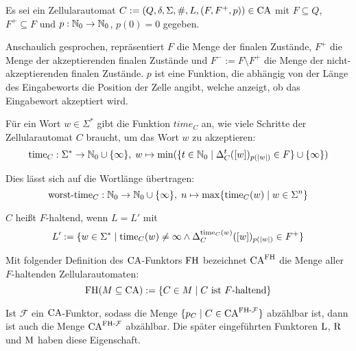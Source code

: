 \begin{definition}
    Es sei ein Zellularautomat $C := (Q, \delta, \Sigma, \#, L, (F, F^+, p)) \in \textrm{CA}$
    mit $F \subseteq Q$, $F^+ \subseteq F$ und $p : \mathbb{N}_0 \to \mathbb{N}_0$, $p(0) = 0$ gegeben.
    
    Anschaulich gesprochen, repräsentiert $F$ die Menge der finalen Zustände, $F^+$ die Menge der akzeptierenden finalen Zustände und
    $F^- := F \setminus F^+$ die Menge der nicht-akzeptierenden finalen Zustände.
    $p$ ist eine Funktion, die abhängig von der Länge des Eingabeworts die Position der Zelle
    angibt, welche anzeigt, ob das Eingabewort akzeptiert wird.
    
    
    Für ein Wort $w \in \Sigma^*$ gibt die Funktion $time_{C}$ an, wie viele Schritte der Zellularautomat $C$ braucht, um das Wort $w$ zu akzeptieren:
    \[
        \operatorname{time}_{C}: \Sigma^* \to \mathbb{N}_0 \cup \{ \infty \}, \; w \mapsto \min (\{ { t \in \mathbb{N}_0 } \; | \; { \Delta_C^t([w])_{p(|w|)} \in F } \} \cup \{ \infty \})
    \]
    
    Dies lässt sich auf die Wortlänge übertragen:
    \[
        \operatorname{\operatorname{worst-time}}_{C}: \mathbb{N}_0 \to \mathbb{N}_0 \cup \{ \infty \}, \;  n \mapsto \max \{ { \operatorname{time}_{C}(w) } \; | \; { w \in \Sigma^n } \}
    \]
    
    $C$ heißt $F$-haltend, wenn $L = L'$ mit
    \[
        L' := \{ { w \in \Sigma^* } \; | \; { 
            \operatorname{time}_{C}(w) \neq \infty \wedge \Delta_C^{\operatorname{time}_{C}(w)}([w])_{p(|w|)} \in F^+ } \}
    \]
    
    Mit folgender Definition des $\textrm{CA}$-Funktors $\textrm{FH}$ bezeichnet $\textrm{CA}^{\textrm{FH}}$ die Menge aller $F$-haltenden Zellularautomaten:
    \[
        \textrm{FH}(M \subseteq \textrm{CA}) := \{ { C \in M } \; | \; { C \text{ ist $F$-haltend} } \}
    \]
    
    Ist $\mathcal{F}$ ein $\textrm{CA}$-Funktor, sodass die Menge $\{ {p_C} \; | \; {C \in \textrm{CA}^{\textrm{FH} \text{-} \mathcal{F}}} \}$ abzählbar ist,
    dann ist auch die Menge $\textrm{CA}^{\textrm{FH} \text{-} \mathcal{F}}$ abzählbar.
    Die später eingeführten Funktoren $\textrm{L}$, $\textrm{R}$ und $\textrm{M}$ haben diese Eigenschaft.
\end{definition}

\begin{comment}
\begin{definition}[Entscheider]
    Ein $F$-haltender Zellularautomat $C$ heißt Entscheider, wenn $\cworsttime_C(\Nz) \subseteq \Nz$,
    $\ctime_C$ also nie den Wert $\infty$ annimmt.
\end{definition}
\end{comment}

